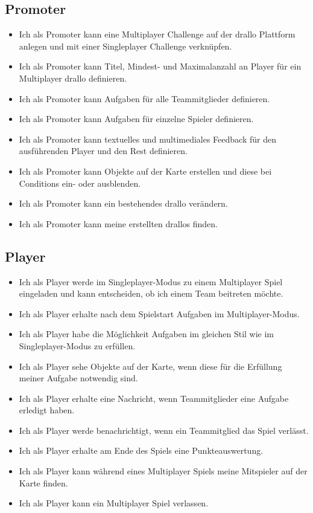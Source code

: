 \subsection{Promoter}
\begin{itemize}
\item Ich als Promoter kann eine Multiplayer Challenge auf der drallo Plattform anlegen und mit einer Singleplayer Challenge verknüpfen.
\item Ich als Promoter kann Titel, Mindest- und Maximalanzahl an Player für ein Multiplayer drallo definieren.
\item Ich als Promoter kann Aufgaben für alle Teammitglieder definieren.
\item Ich als Promoter kann Aufgaben für einzelne Spieler definieren.
\item Ich als Promoter kann textuelles und multimediales Feedback für den ausführenden Player und den Rest definieren.
\item Ich als Promoter kann Objekte auf der Karte erstellen und diese bei Conditions ein- oder ausblenden.
\item Ich als Promoter kann ein bestehendes drallo verändern.
\item Ich als Promoter kann meine erstellten drallos finden.
\end{itemize}

\subsection{Player}
\begin{itemize}
\item Ich als Player werde im Singleplayer-Modus zu einem Multiplayer Spiel eingeladen und kann entscheiden, ob ich einem Team beitreten möchte.
\item Ich als Player erhalte nach dem Spielstart Aufgaben im Multiplayer-Modus.
\item Ich als Player habe die Möglichkeit Aufgaben im gleichen Stil wie im Singleplayer-Modus zu erfüllen.
\item Ich als Player sehe Objekte auf der Karte, wenn diese für die Erfüllung meiner Aufgabe notwendig sind.
\item Ich als Player erhalte eine Nachricht, wenn Teammitglieder eine Aufgabe erledigt haben.
\item Ich als Player werde benachrichtigt, wenn ein Teammitglied das Spiel verlässt.
\item Ich als Player erhalte am Ende des Spiels eine Punkteauswertung.
\item Ich als Player kann während eines Multiplayer Spiels meine Mitspieler auf der Karte finden.
\item Ich als Player kann ein Multiplayer Spiel verlassen.
\end{itemize}
